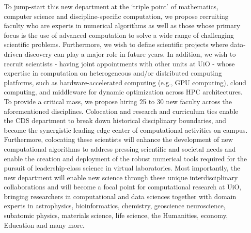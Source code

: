 \documentclass[oneside,final,10pt]{article}
\begin{document}
To jump-start this new department at the ‘triple point’ of mathematics, computer science and
discipline-specific computation, we propose recruiting faculty who are experts in numerical
algorithms as well as those whose primary focus is the use of advanced computation to solve a
wide range of challenging scientific problems. 
Furthermore, we wish to define scientific projects where data-driven discovery can play a major role in future years.
In addition, we wish to recruit scientists - having
joint appointments with other units at UiO - whose expertise in computation on heterogeneous
and/or distributed computing platforms, such as hardware-accelerated computing (e.g., GPU
computing), cloud computing, and middleware for dynamic optimization across HPC
architectures. To provide a critical mass, we propose hiring 25 to 30 new faculty across the
aforementioned disciplines. Colocation and research and curriculum ties enable the CDS department  to
break down historical disciplinary boundaries, and become the synergistic leading-edge center
of computational activities on campus. Furthermore, colocating these scientists will enhance
the development of new computational algorithms to address pressing scientific and societal needs and
enable the creation and deployment of the robust numerical tools required for the pursuit of
leadership-class science in virtual laboratories.
Most importantly, the new department will enable new science through these unique interdisciplinary collaborations and will
become a focal point for computational research at UiO, bringing researchers in
computational and data sciences together with domain experts in astrophysics, bioinformatics, chemistry, geoscience
neuroscience, subatomic physics, materials science, life science, the Humanities, economy, Education  and many more.
\end{document}
